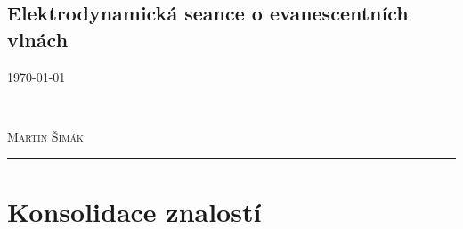 \documentclass[11pt,a4paper]{article}
\begin{document}

    \begin{center}
        \section*{Elektrodynamická seance o evanescentních vlnách}
        \vspace{-4mm}
        \begin{minipage}{0.4\textwidth}
            \begin{flushleft}
                \textsc{\today}
            \end{flushleft}
        \end{minipage}
        ~
        \begin{minipage}{0.4\textwidth}
            \begin{flushright}
                \textsc{Martin Šimák}
            \end{flushright}
        \end{minipage}
        \noindent\rule{14.5cm}{0.6pt}
    \end{center}

    \section{Konsolidace znalostí}
\end{document}
